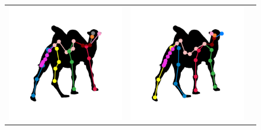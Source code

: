 \begin{figure}[t]
\begin{floatrow}
{\begin{tabular}{ccc}
    \includegraphics[trim={7cm 6cm 7cm 6cm},clip,height=\comparisonheight]{ga_vs_qp/0046_skel_sil_cleaned_qp_3.png} &
    \includegraphics[trim={7cm 6cm 7cm 6cm},clip,height=\comparisonheight]{ga_vs_qp/0046_skel_sil_cleaned_ga_2.png} \\
    

\end{tabular}}
\end{floatrow}
\end{figure}
